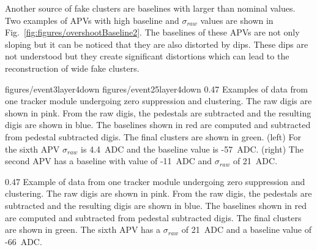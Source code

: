 Another source of fake clusters are baselines with larger than nominal values. Two examples of APVs with high baseline and $\sigma_{raw}$ values are shown in Fig.~\ref{fig:figures/overshootBaseline2}. The baselines of these APVs are not only sloping but it can be noticed that they are also distorted by dips. These dips are not understood but they create significant distortions which can lead to the reconstruction of wide fake clusters.


                 {figures/event3layer4down} %
                 {figures/event25layer4down} %
                 {0.47}       %
                 {Examples of data from one tracker module undergoing zero suppression and clustering. The raw digis are shown in pink. From the raw digis, the pedestals are subtracted and the resulting digis are shown in blue. The baselines shown in red are computed and subtracted from pedestal subtracted digis. The final clusters are shown in green. (left) For the sixth APV  $\sigma_{raw}$ is 4.4~ADC and the baseline value is -57~ADC. (right)  The second APV has a baseline with value of -11~ADC and  $\sigma_{raw}$ of 21~ADC.} %

                 {0.47}       %
                 {Example of data from one tracker module undergoing zero suppression and clustering. The raw digis are shown in pink. From the raw digis, the pedestals are subtracted and the resulting digis are shown in blue. The baselines shown in red are computed and subtracted from pedestal subtracted digis. The final clusters are shown in green. The sixth APV has a $\sigma_{raw}$ of 21~ADC and a baseline value of -66~ADC.} %


